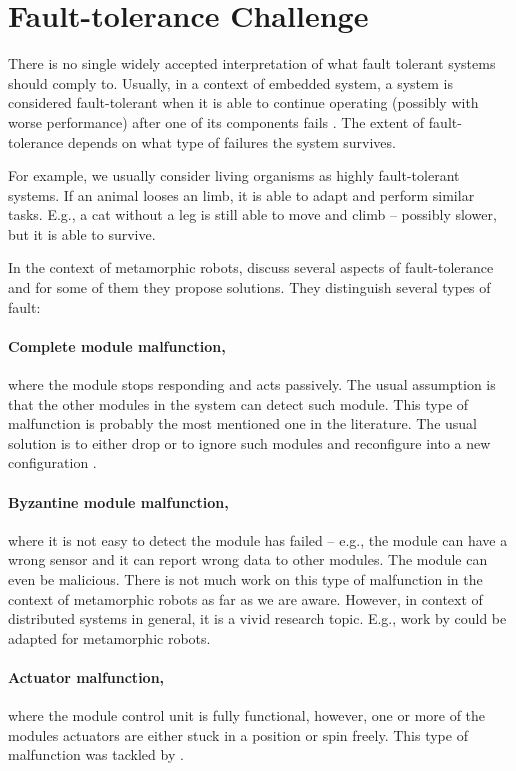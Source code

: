 \section{Fault-tolerance Challenge}

There is no single widely accepted interpretation of what fault tolerant systems
should comply to. Usually, in a context of embedded system, a system is
considered fault-tolerant when it is able to continue operating (possibly with
worse performance) after one of its components fails
\cite{DBLP:journals/micro/Johnson84}. The extent of fault-tolerance depends on
what type of failures the system survives.

For example, we usually consider living organisms as highly fault-tolerant
systems. If an animal looses an limb, it is able to adapt and perform similar
tasks. E.g., a cat without a leg is still able to move and climb -- possibly
slower, but it is able to survive.

In the context of metamorphic robots, \textcite{DKbotDistr} discuss several
aspects of fault-tolerance and for some of them they propose solutions. They
distinguish several types of fault:

\paragraph{Complete module malfunction,} where the module stops responding and
acts passively. The usual assumption is that the other modules in the system can
detect such module. This type of malfunction is probably the most mentioned one
in the literature. The usual solution is to either drop or to ignore such
modules and reconfigure into a new configuration
\cite{DBLP:conf/ieeealife/Christensen07, DMotionCoord}.

\paragraph{Byzantine module malfunction,} where it is not easy to detect the
module has failed -- e.g., the module can have a wrong sensor and it can report
wrong data to other modules. The module can even be malicious. There is not much
work on this type of malfunction in the context of metamorphic robots as far as
we are aware. However, in context of distributed systems in general, it is a
vivid research topic. E.g., work by \textcite{DBLP:conf/osdi/CastroL99} could be
adapted for metamorphic robots.

\paragraph{Actuator malfunction,} where the module control unit is fully
functional, however, one or more of the modules actuators are either stuck
in a position or spin freely. This type of malfunction was tackled by
\textcite{DBLP:conf/romoco/VonasekONW15}.


